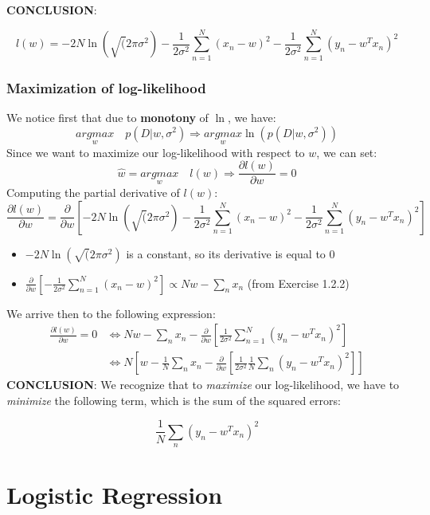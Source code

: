 \documentclass{article}
\begin{document}
\textbf{CONCLUSION}:

\begin{equation} \label{eq4}
\boxed{
l(w) = -2N\ln(\sqrt(2\pi\sigma^2)-\frac{1}{2\sigma^2}\sum\limits_{n=1}^{N}(x_n-w)^2-\frac{1}{2\sigma^2}\sum\limits_{n=1}^{N}(y_n-w^Tx_n)^2
}
\end{equation}

\subsubsection{Maximization of log-likelihood}
We notice first that due to \textbf{monotony} of $\ln$, we have:
\[
\underset{w}{argmax}\quad p(D|w,\sigma^2) \Longrightarrow \underset{w}{argmax} \ln(p(D|w,\sigma^2))
\]
Since we want to maximize our log-likelihood with respect to ${w}$, we can set:
\[
\hat{w} = \underset{w}{argmax}\quad l(w) \Longrightarrow \frac{\partial l(w)}{\partial w} = 0
\]
Computing the partial derivative of $l(w)$:
\[
\frac{\partial l(w)}{\partial w} = \frac{\partial}{\partial w}\left[ -2N\ln(\sqrt(2\pi\sigma^2)-\frac{1}{2\sigma^2}\sum\limits_{n=1}^{N}(x_n-w)^2-\frac{1}{2\sigma^2}\sum\limits_{n=1}^{N}(y_n-w^Tx_n)^2\right]
\]
\begin{itemize}
\item $-2N\ln(\sqrt(2\pi\sigma^2)$ is a constant, so its derivative is equal to 0
\item $\frac{\partial}{\partial w}\left[-\frac{1}{2\sigma^2}\sum\limits_{n=1}^{N}(x_n-w)^2\right] \propto Nw - \sum\limits_{n}x_n$ (from Exercise 1.2.2)
\end{itemize}
We arrive then to the following expression:
\[
\begin{split}
\frac{\partial l(w)}{\partial w} = 0 & \Longleftrightarrow Nw - \sum\limits_{n}x_n - \frac{\partial}{\partial w}\left[\frac{1}{2\sigma^2}\sum\limits_{n=1}^{N}(y_n-w^Tx_n)^2\right] \\
& \Longleftrightarrow N\left[w-\frac{1}{N}\sum\limits_{n}x_n-\frac{\partial}{\partial w}\left[\frac{1}{2\sigma^2}\frac{1}{N}\sum\limits_{n}(y_n-w^Tx_n)^2\right]\right]
\end{split}
\]
\textbf{CONCLUSION}: We recognize that to \textit{maximize} our log-likelihood, we have to \textit{minimize} the following term, which is the sum of the squared errors:

\begin{equation} \label{eq4}
\boxed{
\frac{1}{N}\sum\limits_{n}(y_n-w^Tx_n)^2
}
\end{equation}


\section{Logistic Regression}
\end{document}
